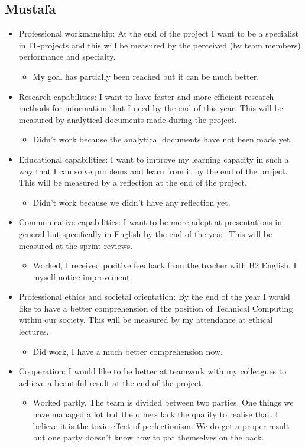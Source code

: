 \documentclass[12pt]{article}
\begin{document}
	\subsection{Mustafa}
	\begin{itemize}
		\item Professional workmanship: At the end of the project I want to be a specialist in IT-projects and this will be measured by the perceived (by team members) performance and specialty.  
		\begin{itemize}
			\item My goal has partially been reached but it can be much better.
		\end{itemize}
		\item Research capabilities: I want to have faster and more efficient research methods for information that I need by the end of this year. This will be measured by analytical documents made during the project.
		\begin{itemize}
			\item Didn't work because the analytical documents have not been made yet.
		\end{itemize}
		\item Educational capabilities: I want to improve my learning capacity in such a way that I can solve problems and learn from it by the end of the project. This will be measured by a reflection at the end of the project.
		\begin{itemize}
			\item Didn't work because we didn't have any reflection yet.
		\end{itemize}
		\item Communicative capabilities: I want to be more adept at presentations in general but specifically in English by the end of the year. This will be measured at the sprint reviews.
		\begin{itemize}
			\item 	Worked, I received positive feedback from the teacher with B2 English. I myself notice improvement.
		\end{itemize} 
		\item Professional ethics and societal orientation: By the end of the year I would like to have a better comprehension of the position of Technical Computing within our society. This will be measured by my attendance at ethical lectures.
		\begin{itemize}
			\item Did work, I have a much better comprehension now.
		\end{itemize}
		\item Cooperation: I would like to be better at teamwork with my colleagues to achieve a beautiful result at the end of the project. 
		\begin{itemize}
			\item Worked partly. The team is divided between two parties. One things we have managed a lot but the others lack the quality to realise that. I believe it is the toxic effect of perfectionism. We do get a proper result but one party doesn't know how to pat themselves on the back.  
		\end{itemize}
	\end{itemize}
\end{document}

